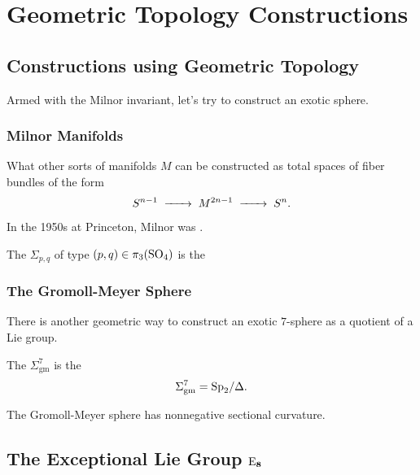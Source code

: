 \chapter{Geometric Topology Constructions}\label{chap:geometric_topology_constructions}

\section{Constructions using Geometric Topology}

Armed with the Milnor invariant, let's try to construct an exotic sphere.

\subsection*{Milnor Manifolds}

What other sorts of manifolds $M$ can be constructed as total spaces of fiber bundles of the form
\[
	S^{n-1} \lkxto M^{2n-1} \lkxto S^n.
\]

\begin{historicalremark*}
	In the 1950s at Princeton, Milnor was \cite{milnor2000exotic}. 
\end{historicalremark*}


\begin{definition}
	The  $\Sigma_{p,q}$ of type $(p,q)\in \pi_3({\operatorname{SO}}_4)$ is the
\end{definition}

\subsection*{The Gromoll-Meyer Sphere}

There is another geometric way to construct an exotic $7$-sphere as a quotient of a Lie group.

\begin{definition}
	The  $\Sigma_{\mathrm{gm}}^7$ is the
	\[
		\Sigma_{\mathrm{gm}}^7 = {\operatorname{Sp}}_2/\Delta.
	\]
\end{definition}

\begin{theorem}
	The Gromoll-Meyer sphere has nonnegative sectional curvature.
\end{theorem}

\section{The Exceptional Lie Group \texorpdfstring{$\mathbf{{\operatorname{E}}_8}$}{E8}}
